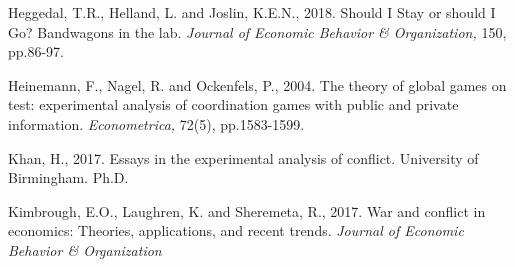 \documentclass[12pt, letterpaper]{article}
\theoremstyle{plain}
\begin{document}
\begin{thebibliography}{10}


\bibitem{} Heggedal, T.R., Helland, L. and Joslin, K.E.N., 2018. Should I Stay or should I Go? Bandwagons in the lab. \textit{Journal of Economic Behavior \& Organization,} 150, pp.86-97.

\bibitem{}Heinemann, F., Nagel, R. and Ockenfels, P., 2004. The theory of global games on test: experimental analysis of coordination games with public and private information. \textit{Econometrica, } 72(5), pp.1583-1599.






\bibitem{} Khan, H., 2017. Essays in the experimental analysis of conflict. University of Birmingham. Ph.D.

\bibitem{} Kimbrough, E.O., Laughren, K. and Sheremeta, R., 2017. War and conflict in economics: Theories, applications, and recent trends. \textit{Journal of Economic Behavior \& Organization}



\end{thebibliography}
\end{document}
